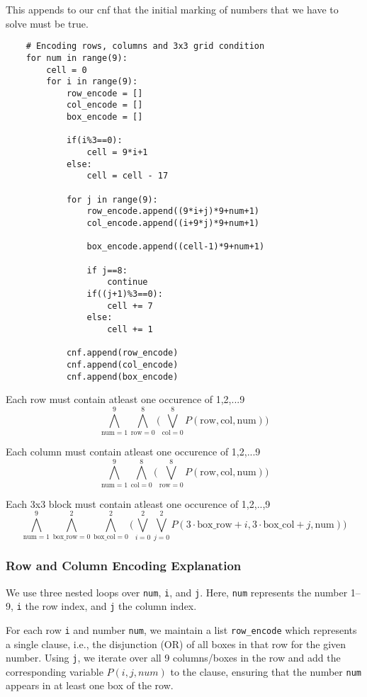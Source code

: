 \documentclass[12pt,a4paper]{article}
\begin{document}
This appends to our cnf that the initial marking of numbers that we have to solve must be true.

\begin{lstlisting}
    # Encoding rows, columns and 3x3 grid condition
    for num in range(9):
        cell = 0
        for i in range(9):
            row_encode = []
            col_encode = []
            box_encode = []

            if(i%3==0):
                cell = 9*i+1
            else:
                cell = cell - 17

            for j in range(9):
                row_encode.append((9*i+j)*9+num+1)
                col_encode.append((i+9*j)*9+num+1)

                box_encode.append((cell-1)*9+num+1)

                if j==8:
                    continue
                if((j+1)%3==0):
                    cell += 7
                else:
                    cell += 1

            cnf.append(row_encode)
            cnf.append(col_encode)
            cnf.append(box_encode)
\end{lstlisting}

Each row must contain atleast one occurence of 1,2,...9
\[
\bigwedge_{\text{num}=1}^{9} \bigwedge_{\text{row}=0}^{8} 
\Bigg( \bigvee_{\text{col}=0}^{8} P(\text{row}, \text{col}, \text{num}) \Bigg)
\]

Each column must contain atleast one occurence of 1,2,...9
\[
\bigwedge_{\text{num}=1}^{9} \bigwedge_{\text{col}=0}^{8} 
\Bigg( \bigvee_{\text{row}=0}^{8} P(\text{row}, \text{col}, \text{num}) \Bigg)
\]

Each 3x3 block must contain atleast one occurence of 1,2,..,9
\[
\bigwedge_{\text{num}=1}^{9} 
\bigwedge_{\text{box\_row}=0}^{2} 
\bigwedge_{\text{box\_col}=0}^{2} 
\Bigg(
\bigvee_{i=0}^{2} \bigvee_{j=0}^{2} 
P(3 \cdot \text{box\_row} + i, 3 \cdot \text{box\_col} + j, \text{num})
\Bigg)
\]

\subsubsection*{Row and Column Encoding Explanation}

We use three nested loops over \texttt{num}, \texttt{i}, and \texttt{j}. Here, \texttt{num} represents the number 1--9, \texttt{i} the row index, and \texttt{j} the column index.

For each row \texttt{i} and number \texttt{num}, we maintain a list \texttt{row\_encode} which represents a single clause, i.e., the disjunction (OR) of all boxes in that row for the given number. Using \texttt{j}, we iterate over all 9 columns/boxes in the row and add the corresponding variable \(P(i, j, num)\) to the clause, ensuring that the number \texttt{num} appears in at least one box of the row.
\end{document}
